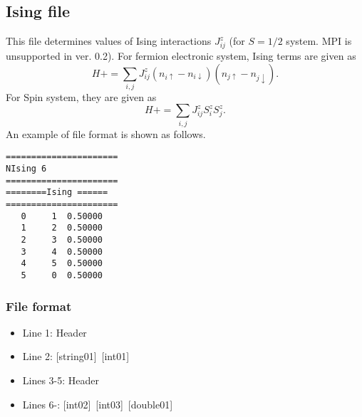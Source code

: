 \newpage
\subsection{Ising file}
This file determines values of Ising interactions $J_{ij}^{z}$ {(for $S=1/2$ system. MPI is unsupported in ver. 0.2)}.
For fermion electronic system, Ising terms are given as
\begin{equation}
H+=\sum_{i,j}J_{ij}^{z} (n_{i\uparrow}-n_{i\downarrow})(n_{j\uparrow}-n_{j\downarrow} ).
\end{equation}
For Spin system, they are given as
\begin{equation}
H+=\sum_{i,j}J_{ij}^{z} S_ {i}^{z}S_{j}^z.
\end{equation}
An example of file format is shown as follows.

\begin{minipage}{12.5cm}
\begin{screen}
\begin{verbatim}
====================== 
NIsing 6  
====================== 
========Ising ====== 
====================== 
   0     1  0.50000
   1     2  0.50000
   2     3  0.50000
   3     4  0.50000
   4     5  0.50000
   5     0  0.50000
\end{verbatim}
\end{screen}
\end{minipage}

\subsubsection{File format}
 \begin{itemize}
   \item  Line 1:  Header
   \item  Line 2:   [string01]~[int01]
   \item  Lines 3-5:  Header
   \item  Lines 6-: 
   [int02]~[int03]~[double01] 
  \end{itemize}
